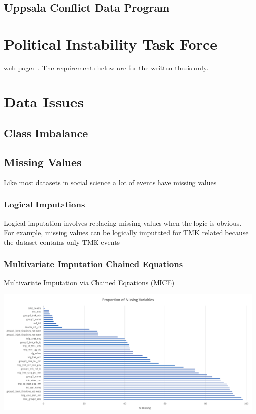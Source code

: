 \subsection{Uppsala Conflict Data Program}
\section{Political Instability Task Force}
web-pages~\cite{Noo05}.  The requirements below are for the written thesis
only.


\section{Data Issues}
\subsection{Class Imbalance}
\subsection{Missing Values}
Like most datasets in social science a lot of events have missing values
\subsubsection{Logical Imputations}
Logical imputation involves replacing missing values when the logic is obvious. For example, missing values can be logically imputated for TMK related because the dataset contains only TMK events

\subsubsection{Multivariate Imputation Chained Equations}
Multivariate Imputation via Chained Equations (MICE) 

\begin{center}
    \includegraphics{Screen Shot 2021-04-17 at 15.01.40.png}
\end{center}



